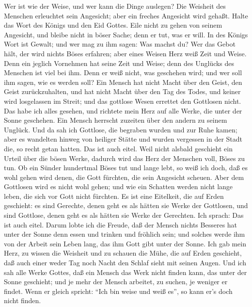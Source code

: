 Wer ist wie der Weise, und wer kann die Dinge auslegen? Die
Weisheit des Menschen erleuchtet sein Angesicht; aber ein freches
Angesicht wird gehaßt.  Halte das Wort des Königs und den
Eid Gottes.  Eile nicht zu gehen von seinem Angesicht, und
bleibe nicht in böser Sache; denn er tut, was er will.  In
des Königs Wort ist Gewalt; und wer mag zu ihm sagen: Was machst du?
 Wer das Gebot hält, der wird nichts Böses erfahren; aber
eines Weisen Herz weiß Zeit und Weise.  Denn ein jeglich
Vornehmen hat seine Zeit und Weise; denn des Unglücks des Menschen ist
viel bei ihm.  Denn er weiß nicht, was geschehen wird; und
wer soll ihm sagen, wie es werden soll?  Ein Mensch hat
nicht Macht über den Geist, den Geist zurückzuhalten, und hat nicht
Macht über den Tag des Todes, und keiner wird losgelassen im Streit; und
das gottlose Wesen errettet den Gottlosen nicht.  Das habe
ich alles gesehen, und richtete mein Herz auf alle Werke, die unter der
Sonne geschehen. Ein Mensch herrscht zuzeiten über den andern zu seinem
Unglück.  Und da sah ich Gottlose, die begraben wurden und
zur Ruhe kamen; aber es wandelten hinweg von heiliger Stätte und wurden
vergessen in der Stadt die, so recht getan hatten. Das ist auch eitel.
 Weil nicht alsbald geschieht ein Urteil über die bösen
Werke, dadurch wird das Herz der Menschen voll, Böses zu tun.
 Ob ein Sünder hundertmal Böses tut und lange lebt, so weiß
ich doch, daß es wohl gehen wird denen, die Gott fürchten, die sein
Angesicht scheuen.  Aber dem Gottlosen wird es nicht wohl
gehen; und wie ein Schatten werden nicht lange leben, die sich vor Gott
nicht fürchten.  Es ist eine Eitelkeit, die auf Erden
geschieht: es sind Gerechte, denen geht es als hätten sie Werke der
Gottlosen, und sind Gottlose, denen geht es als hätten sie Werke der
Gerechten. Ich sprach: Das ist auch eitel.  Darum lobte ich
die Freude, daß der Mensch nichts Besseres hat unter der Sonne denn
essen und trinken und fröhlich sein; und solches werde ihm von der
Arbeit sein Leben lang, das ihm Gott gibt unter der Sonne. 
Ich gab mein Herz, zu wissen die Weisheit und zu schauen die Mühe, die
auf Erden geschieht, daß auch einer weder Tag noch Nacht den Schlaf
sieht mit seinen Augen.  Und ich sah alle Werke Gottes, daß
ein Mensch das Werk nicht finden kann, das unter der Sonne geschieht;
und je mehr der Mensch arbeitet, zu suchen, je weniger er findet. Wenn
er gleich spricht: ``Ich bin weise und weiß es'', so kann er's doch
nicht finden.

